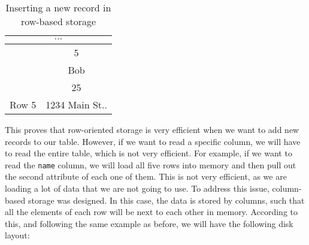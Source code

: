 \begin{table}[ht]
    \centering
    \begin{tabular}{|c|c|}
        \hline
        \multicolumn{2}{|c|}{$\cdots$}                                   \\ \hline
        \cellcolor[HTML]{C0C0C0}                        & 5              \\ \cline{2-2}
        \cellcolor[HTML]{C0C0C0}                        & Bob            \\ \cline{2-2}
        \cellcolor[HTML]{C0C0C0}                        & 25             \\ \cline{2-2}
        \multirow{-4}{*}{\cellcolor[HTML]{C0C0C0}Row 5} & 1234 Main St.. \\ \hline
    \end{tabular}
    \caption{Inserting a new record in row-based storage}
\end{table}

This proves that row-oriented storage is very efficient when we want to add new records to our table. However, if we want to read a specific column, we will have to read the entire table, which is not very efficient. For example, if we want to read the \texttt{name} column, we will load all five rows into memory and then pull out the second attribute of each one of them. This is not very efficient, as we are loading a lot of data that we are not going to use. To address this issue, column-based storage was designed. In this case, the data is stored by columns, such that all the elements of each row will be next to each other in memory. According to this, and following the same example as before, we will have the following disk layout:

